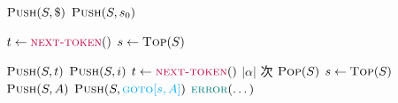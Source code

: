 
\begin{algorithm}[H]
\begin{algorithmic}[1]
    \State $\Call{Push}{S, \$}$ \qquad $\Call{Push}{S, s_{0}}$

    \hStatex
    \State $t \gets \Call{\purple{next-token}}{\null}$
      \State $s \gets \Call{Top}{S}$  

      \hStatex
       
        \State $\Call{Push}{S, t}$ \qquad $\Call{Push}{S, i}$
        \State $t \gets \Call{\purple{next-token}}{\null}$
       
        \State $|\alpha|$ 次 $\Call{Pop}{S}$
        \State $s \gets \Call{Top}{S}$  
        \State $\Call{Push}{S, A}$ \qquad $\Call{Push}{S, \cyan{\goto[s, A]}}$ 
       
      \Else
        \State $\Call{\teal{error}}{\dots}$
      \EndIf
    \EndWhile
  \EndProcedure
\end{algorithmic}
\end{algorithm}